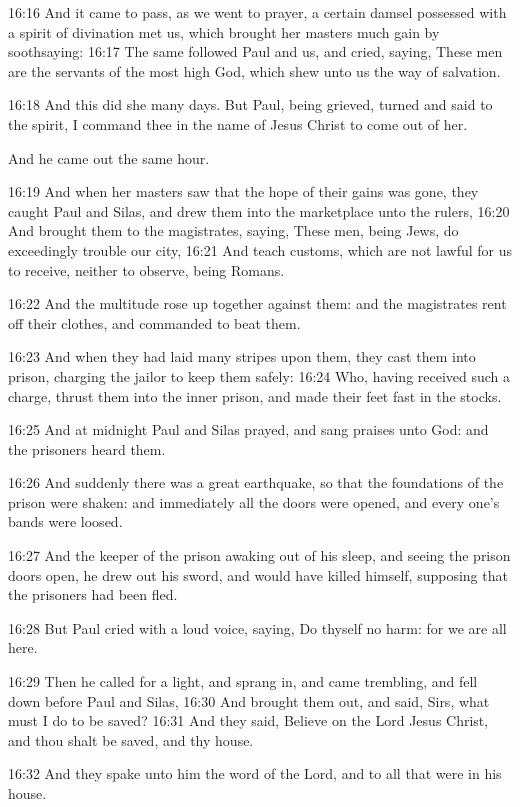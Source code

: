 16:16 And it came to pass, as we went to prayer, a certain damsel
possessed with a spirit of divination met us, which brought her
masters much gain by soothsaying: 16:17 The same followed Paul and us,
and cried, saying, These men are the servants of the most high God,
which shew unto us the way of salvation.

16:18 And this did she many days. But Paul, being grieved, turned and
said to the spirit, I command thee in the name of Jesus Christ to come
out of her.

And he came out the same hour.

16:19 And when her masters saw that the hope of their gains was gone,
they caught Paul and Silas, and drew them into the marketplace unto
the rulers, 16:20 And brought them to the magistrates, saying, These
men, being Jews, do exceedingly trouble our city, 16:21 And teach
customs, which are not lawful for us to receive, neither to observe,
being Romans.

16:22 And the multitude rose up together against them: and the
magistrates rent off their clothes, and commanded to beat them.

16:23 And when they had laid many stripes upon them, they cast them
into prison, charging the jailor to keep them safely: 16:24 Who,
having received such a charge, thrust them into the inner prison, and
made their feet fast in the stocks.

16:25 And at midnight Paul and Silas prayed, and sang praises unto
God: and the prisoners heard them.

16:26 And suddenly there was a great earthquake, so that the
foundations of the prison were shaken: and immediately all the doors
were opened, and every one's bands were loosed.

16:27 And the keeper of the prison awaking out of his sleep, and
seeing the prison doors open, he drew out his sword, and would have
killed himself, supposing that the prisoners had been fled.

16:28 But Paul cried with a loud voice, saying, Do thyself no harm:
for we are all here.

16:29 Then he called for a light, and sprang in, and came trembling,
and fell down before Paul and Silas, 16:30 And brought them out, and
said, Sirs, what must I do to be saved?  16:31 And they said, Believe
on the Lord Jesus Christ, and thou shalt be saved, and thy house.

16:32 And they spake unto him the word of the Lord, and to all that
were in his house.

